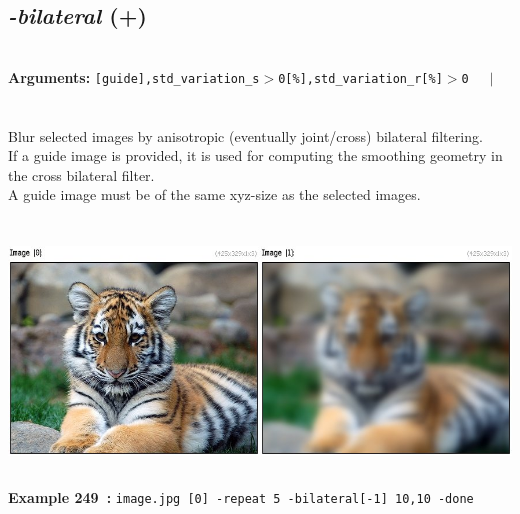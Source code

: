 \documentclass[a4paper,11pt,twoside]{book}
\begin{document}
\subsection{\emph{-bilateral} (+)}\vspace*{-0.5em}
~\\\textbf{Arguments: } 
{\small \texttt{[guide],std\_variation\_s$>$0[\%],std\_variation\_r[\%]$>$0}}~~~$|$\\
\\~\\
Blur selected images by anisotropic (eventually joint/cross) bilateral filtering.
~\\If a guide image is provided, it is used for computing the smoothing geometry in the cross bilateral filter.
~\\A guide image must be of the same xyz-size as the selected images.
\begin{center}\includegraphics[keepaspectratio=true,height=7cm,width=\textwidth]{img/gmic_def249.jpg}\\
{\footnotesize \textbf{Example 249~:} \texttt{image.jpg [0] -repeat 5 -bilateral[-1] 10,10 -done}}
\end{center}
\end{document}
